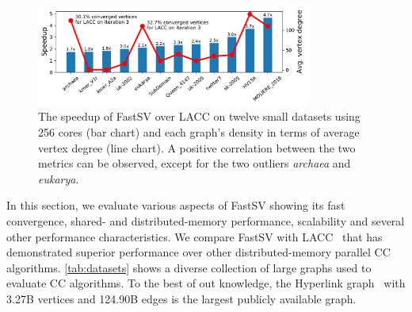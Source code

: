 \documentclass{sokendai_thesis} %
\newcommand{\Name}[0]{FastSV} %
\begin{document}
\begin{figure}[t]
\centering
\includegraphics[width=0.8\textwidth]{figures/density-speedup.pdf}
\vspace{-5pt}
\caption{The speedup of \Name{} over LACC on twelve small datasets using 256 cores (bar chart) and each graph's density in terms of average vertex degree (line chart). A positive correlation between the two metrics can be observed, except for the two outliers \textit{archaea} and \textit{eukarya}.} %
\vspace{-10pt}
\label{fig:density-speedup}
\end{figure}

In this section, we evaluate various aspects of \Name{} showing its fast convergence, shared- and distributed-memory performance, scalability and several other performance characteristics.
We compare \Name{} with LACC~\cite{lacc} that has demonstrated superior performance over other distributed-memory parallel CC algorithms. 
\autoref{tab:datasets} shows a diverse collection of large graphs used to evaluate CC algorithms. 
To the best of out knowledge, the Hyperlink graph~\cite{meusel2014graph} with 3.27B vertices and  124.90B edges is the largest publicly available graph.
\end{document}
